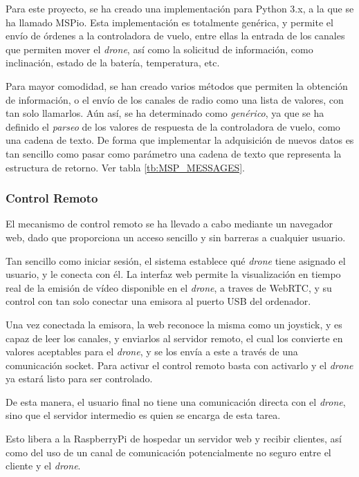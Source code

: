 Para este proyecto, se ha creado una implementación para Python 3.x, a la que se ha llamado MSPio.
Esta implementación es totalmente genérica, y permite el envío de órdenes a la controladora de vuelo, entre ellas la entrada de los canales que permiten mover el \emph{drone}, así como la solicitud de información, como inclinación, estado de la batería, temperatura, etc.

Para mayor comodidad, se han creado varios métodos que permiten la obtención de información, o el envío de los canales de radio como una lista de valores, con tan solo llamarlos. Aún así, se ha determinado como \emph{genérico}, ya que se ha definido el \emph{parseo} de los valores de respuesta de la controladora de vuelo, como una cadena de texto.
De forma que implementar la adquisición de nuevos datos es tan sencillo como pasar como parámetro una cadena de texto que representa la estructura de retorno. Ver tabla \ref{tb:MSP_MESSAGES}.

\subsubsection{Control Remoto}

El mecanismo de control remoto se ha llevado a cabo mediante un navegador web, dado que proporciona un acceso sencillo y sin barreras a cualquier usuario. 

Tan sencillo como iniciar sesión, el sistema establece qué \emph{drone} tiene asignado el usuario, y le conecta con él. La interfaz web permite la visualización en tiempo real de la emisión de vídeo disponible en el \emph{drone}, a traves de WebRTC, y su control con tan solo conectar una emisora al puerto USB del ordenador. 

Una vez conectada la emisora, la web reconoce la misma como un joystick, y es capaz de leer los canales, y enviarlos al servidor remoto, el cual los convierte en valores aceptables para el \emph{drone}, y se los envía a este a través de una comunicación socket.
Para activar el control remoto basta con activarlo y el \emph{drone} ya estará listo para ser controlado.

De esta manera, el usuario final no tiene una comunicación directa con el \emph{drone}, sino que el servidor intermedio es quien se encarga de esta tarea. 

Esto libera a la RaspberryPi de hospedar un servidor web y recibir clientes, así como del uso de un canal de comunicación potencialmente no seguro entre el cliente y el \emph{drone}. 


